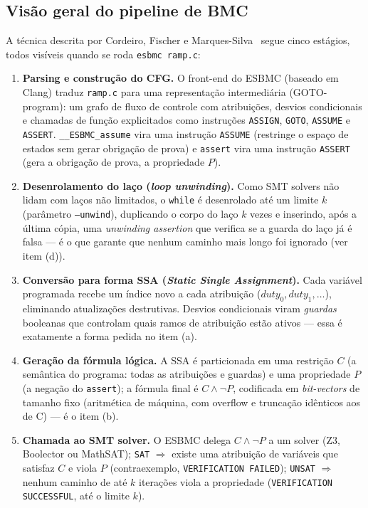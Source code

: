 \documentclass[12pt,a4paper]{article}
\newcommand{\vv}[1]{\texttt{#1}}
\begin{document}
\subsection*{Vis\~ao geral do pipeline de BMC}
A t\'ecnica descrita por Cordeiro, Fischer e Marques-Silva~\cite{cordeiro2012} segue cinco
est\'agios, todos vis\'iveis quando se roda \texttt{esbmc ramp.c}:

\begin{enumerate}[leftmargin=2cm]
  \item \textbf{Parsing e constru\c{c}\~ao do CFG.} O front-end do ESBMC (baseado em
  Clang) traduz \vv{ramp.c} para uma representa\c{c}\~ao intermedi\'aria (GOTO-program):
  um grafo de fluxo de controle com atribui\c{c}\~oes, desvios condicionais e chamadas
  de fun\c{c}\~ao explicitados como instru\c{c}\~oes \texttt{ASSIGN}, \texttt{GOTO},
  \texttt{ASSUME} e \texttt{ASSERT}. \texttt{\_\_ESBMC\_assume} vira uma instru\c{c}\~ao
  \texttt{ASSUME} (restringe o espa\c{c}o de estados sem gerar obriga\c{c}\~ao de prova) e
  \texttt{assert} vira uma instru\c{c}\~ao \texttt{ASSERT} (gera a obriga\c{c}\~ao de
  prova, a propriedade $P$).
  \item \textbf{Desenrolamento do la\c{c}o (\emph{loop unwinding}).} Como SMT solvers
  n\~ao lidam com la\c{c}os n\~ao limitados, o \texttt{while} \'e desenrolado at\'e um
  limite $k$ (par\^ametro \texttt{--unwind}), duplicando o corpo do la\c{c}o $k$ vezes e
  inserindo, ap\'os a \'ultima c\'opia, uma \emph{unwinding assertion} que verifica se a
  guarda do la\c{c}o j\'a \'e falsa --- \'e o que garante que nenhum caminho mais longo
  foi ignorado (ver item (d)).
  \item \textbf{Convers\~ao para forma SSA (\emph{Static Single Assignment}).} Cada
  vari\'avel programada recebe um \'indice novo a cada atribui\c{c}\~ao ($duty_0, duty_1,
  \dots$), eliminando atualiza\c{c}\~oes destrutivas. Desvios condicionais viram
  \emph{guardas} booleanas que controlam quais ramos de atribui\c{c}\~ao est\~ao ativos
  --- essa \'e exatamente a forma pedida no item (a).
  \item \textbf{Gera\c{c}\~ao da f\'ormula l\'ogica.} A SSA \'e particionada em uma
  restri\c{c}\~ao $C$ (a sem\^antica do programa: todas as atribui\c{c}\~oes e guardas) e
  uma propriedade $P$ (a nega\c{c}\~ao do \texttt{assert}); a f\'ormula final \'e
  $C \wedge \neg P$, codificada em \emph{bit-vectors} de tamanho fixo (aritm\'etica de
  m\'aquina, com overflow e trunca\c{c}\~ao id\^enticos aos de C) --- \'e o item (b).
  \item \textbf{Chamada ao SMT solver.} O ESBMC delega $C\wedge\neg P$ a um solver
  (Z3, Boolector ou MathSAT); \texttt{SAT} $\Rightarrow$ existe uma atribui\c{c}\~ao de
  vari\'aveis que satisfaz $C$ e viola $P$ (contraexemplo, \texttt{VERIFICATION FAILED});
  \texttt{UNSAT} $\Rightarrow$ nenhum caminho de at\'e $k$ itera\c{c}\~oes viola a
  propriedade (\texttt{VERIFICATION SUCCESSFUL}, at\'e o limite $k$).
\end{enumerate}
\end{document}
